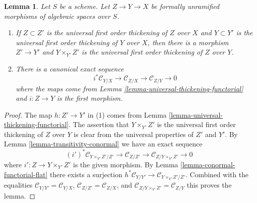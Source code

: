 \documentclass[10pt,a4paper]{amsart}
\theoremstyle{plain}
\newtheorem{lemma}[subsection]{Lemma}
\theoremstyle{definition}
\theoremstyle{remark}
\numberwithin{equation}{subsection}
\begin{document}
\begin{lemma}
\label{lemma-transitivity-conormal-unramified}
Let $S$ be a scheme.
Let $Z \to Y \to X$ be formally unramified morphisms of
algebraic spaces over $S$.
\begin{enumerate}
\item If $Z \subset Z'$ is the universal first order thickening of $Z$
over $X$ and $Y \subset Y'$ is the universal first order thickening of $Y$
over $X$, then there is a morphism $Z' \to Y'$ and $Y \times_{Y'} Z'$ is
the universal first order thickening of $Z$ over $Y$.
\item There is a canonical exact sequence
$$
i^*\mathcal{C}_{Y/X} \to
\mathcal{C}_{Z/X} \to
\mathcal{C}_{Z/Y} \to 0
$$
where the maps come from
Lemma \ref{lemma-universal-thickening-functorial}
and $i : Z \to Y$ is the first morphism.
\end{enumerate}
\end{lemma}

\begin{proof}
The map $h : Z' \to Y'$ in (1) comes from
Lemma \ref{lemma-universal-thickening-functorial}.
The assertion that $Y \times_{Y'} Z'$ is the universal first order
thickening of $Z$ over $Y$ is clear from the universal properties
of $Z'$ and $Y'$. By
Lemma \ref{lemma-transitivity-conormal}
we have an exact sequence
$$
(i')^*\mathcal{C}_{Y \times_{Y'} Z'/Z'} \to
\mathcal{C}_{Z/Z'} \to
\mathcal{C}_{Z/Y \times_{Y'} Z'} \to 0
$$
where $i' : Z \to Y \times_{Y'} Z'$ is the given morphism. By
Lemma \ref{lemma-conormal-functorial-flat}
there exists a surjection
$h^*\mathcal{C}_{Y/Y'} \to \mathcal{C}_{Y \times_{Y'} Z'/Z'}$.
Combined with the equalities
$\mathcal{C}_{Y/Y'} = \mathcal{C}_{Y/X}$,
$\mathcal{C}_{Z/Z'} = \mathcal{C}_{Z/X}$, and
$\mathcal{C}_{Z/Y \times_{Y'} Z'} = \mathcal{C}_{Z/Y}$
this proves the lemma.
\end{proof}
\end{document}
